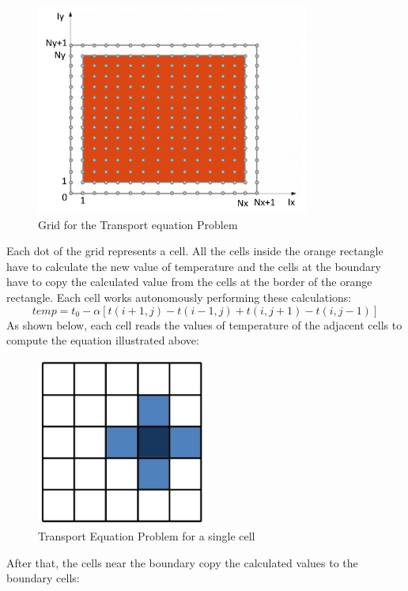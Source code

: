 \begin{figure}[h!]
	\centering
	\includegraphics[width=0.8\textwidth]{imm/tep/tep0.png}  
	\caption{Grid for the Transport equation Problem} 
	\label{tep0}
\end{figure}
\bigskip
Each dot of the grid represents a cell. All the cells inside the orange rectangle have to calculate the new value of temperature and the cells at the boundary have to copy the calculated value from the cells at the border of the orange rectangle. Each cell works autonomously performing these calculations: 
\begin{equation}
	temp = t_{0}-\alpha[t(i+1,j)-t(i-1,j)+t(i,j + 1)-t(i,j-1)] 
\end{equation}
As shown below, each cell reads the values of temperature of the adjacent cells to compute the equation illustrated above:
\begin{figure}[h!]
	\centering
	\includegraphics[width=0.5\textwidth]{imm/tep/tep1.png}  
	\caption{Transport Equation Problem for a single cell} 
	\label{tep1}
\end{figure}
After that, the cells near the boundary copy the calculated values to the boundary cells:
